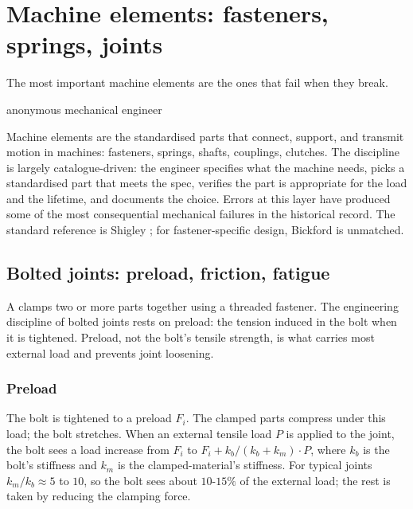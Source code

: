 \chapter{Machine elements: fasteners, springs, joints}
\label{vol08:ch03}

\epigraph{The most important machine elements are the ones that fail when they break.}{anonymous mechanical engineer}


\noindent
Machine elements are the standardised parts that connect, support, and transmit motion in machines: fasteners, springs, shafts, couplings, clutches. The discipline is largely catalogue-driven: the engineer specifies what the machine needs, picks a standardised part that meets the spec, verifies the part is appropriate for the load and the lifetime, and documents the choice. Errors at this layer have produced some of the most consequential mechanical failures in the historical record. The standard reference is Shigley \cite{text:shigley-mechanical-design}; for fastener-specific design, Bickford \cite{text:bickford-bolted-joints} is unmatched.

\section{Bolted joints: preload, friction, fatigue}

A  clamps two or more parts together using a threaded fastener. The engineering discipline of bolted joints rests on preload: the tension induced in the bolt when it is tightened. Preload, not the bolt's tensile strength, is what carries most external load and prevents joint loosening.

\subsection{Preload}

The bolt is tightened to a preload $F_i$. The clamped parts compress under this load; the bolt stretches. When an external tensile load $P$ is applied to the joint, the bolt sees a load increase from $F_i$ to $F_i + k_b/(k_b + k_m) \cdot P$, where $k_b$ is the bolt's stiffness and $k_m$ is the clamped-material's stiffness. For typical joints $k_m / k_b \approx 5$ to $10$, so the bolt sees about $10$-$15\%$ of the external load; the rest is taken by reducing the clamping force.

